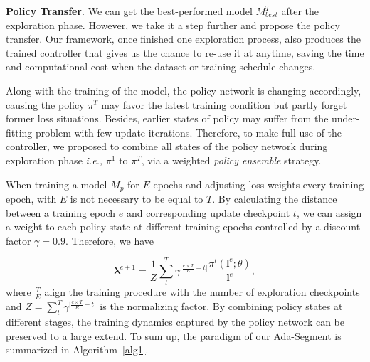 \documentclass[letterpaper]{article} \usepackage{aaai21}  \usepackage{times}  \usepackage{helvet} \usepackage{courier}  \usepackage[hyphens]{url}  \usepackage{graphicx} \urlstyle{rm} \def\UrlFont{\rm}  \usepackage{natbib}  \usepackage{caption} \frenchspacing  \setlength{\pdfpagewidth}{8.5in}  \setlength{\pdfpageheight}{11in}
\begin{document}
 \noindent
 \textbf{Policy Transfer}.
We can get the best-performed model $M^T_{best}$ after the exploration phase. 
 However, we take it a step further and propose the policy transfer. 
 Our framework, once finished one exploration 
 process, also produces the trained controller that 
gives us the chance to re-use it at anytime,
 saving the time and computational cost when the dataset or training schedule changes.
 
 Along with the training of the model, the policy network is changing accordingly, causing the 
 policy $\pi^T$ may favor the latest training condition but partly forget former loss situations. 
 Besides, earlier states of policy may suffer from the under-fitting problem with few update iterations. 
Therefore, to make full use of the controller, 
 we proposed to combine all states of the policy network during exploration phase 
 \textit{i.e., }$\pi^1$ to $\pi^T$, via a weighted
 \textit{policy ensemble} strategy.

When training a model $M_p$ for $E$ epochs and adjusting loss weights every training epoch, 
 with $E$ is not necessary to be equal to $T$. 
By calculating the distance between a training epoch $e$ and corresponding update checkpoint $t$, 
 we can assign a weight to each policy state at different training epochs controlled by 
 a discount factor $\gamma=0.9$. Therefore, we have 


 \begin{equation}
   \boldsymbol{\lambda}^{e+1}=\frac{1}{Z}\sum^T_t{\gamma^{\lvert \frac{e\times T}{E}-t \rvert}\frac{\pi^t(\boldsymbol{l}^e;\theta)}
   {\boldsymbol{l}^e}},
  \label{eq:policy_ensemble}
 \end{equation}
where $\frac{T}{E}$ align the training procedure with the number of exploration checkpoints and
$Z=\sum^T_t{\gamma^{\lvert \frac{e\times T}{E}-t \rvert}}$ is the normalizing factor.
 By combining policy states at different stages, the training dynamics
 captured by the policy network can be preserved to a large extend.
To sum up, the paradigm of our Ada-Segment is summarized in Algorithm~\ref{alg1}.  
  
\end{document}
